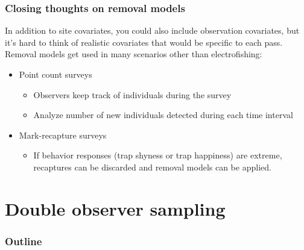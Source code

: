 \documentclass[color=usenames,dvipsnames]{beamer}\usepackage[]{graphicx}\usepackage[]{color}
\begin{document}
\begin{frame}
  \frametitle{Closing thoughts on removal models}
  In addition to site covariates, you could also include observation
  covariates, but it's hard to think of realistic covariates that
  would be specific to each pass. \\
  \pause
  \vfill
  Removal models get used in many scenarios other than electrofishing:
  \begin{itemize}
    \item<2-> Point count surveys
    \begin{itemize}
      \item Observers keep track of individuals during the survey
      \item Analyze number of new individuals detected during each
        time interval
    \end{itemize}
    \item<3-> Mark-recapture surveys
      \begin{itemize}
        \item If behavior responses (trap shyness or trap happiness)
          are extreme, recaptures can be discarded and removal models
          can be applied.
      \end{itemize}
  \end{itemize}
\end{frame}




\section{Double observer sampling}

\begin{frame}
  \frametitle{Outline}
  \Large
\end{frame}
\end{document}
